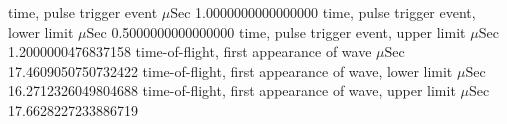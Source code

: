 \expandafter\def\csname oct2tex.water_d25_v800_P.t0.d\endcsname{time, pulse trigger event}
\expandafter\def\csname oct2tex.water_d25_v800_P.t0.u\endcsname{\ensuremath{\mu\text{Sec}}}
\expandafter\def\csname oct2tex.water_d25_v800_P.t0.v\endcsname{1.0000000000000000}
\expandafter\def\csname oct2tex.water_d25_v800_P.t0a.d\endcsname{time, pulse trigger event, lower limit}
\expandafter\def\csname oct2tex.water_d25_v800_P.t0a.u\endcsname{\ensuremath{\mu\text{Sec}}}
\expandafter\def\csname oct2tex.water_d25_v800_P.t0a.v\endcsname{0.5000000000000000}
\expandafter\def\csname oct2tex.water_d25_v800_P.t0b.d\endcsname{time, pulse trigger event, upper limit}
\expandafter\def\csname oct2tex.water_d25_v800_P.t0b.u\endcsname{\ensuremath{\mu\text{Sec}}}
\expandafter\def\csname oct2tex.water_d25_v800_P.t0b.v\endcsname{1.2000000476837158}
\expandafter\def\csname oct2tex.water_d25_v800_P.t1.d\endcsname{time-of-flight, first appearance of wave}
\expandafter\def\csname oct2tex.water_d25_v800_P.t1.u\endcsname{\ensuremath{\mu\text{Sec}}}
\expandafter\def\csname oct2tex.water_d25_v800_P.t1.v\endcsname{17.4609050750732422}
\expandafter\def\csname oct2tex.water_d25_v800_P.t1a.d\endcsname{time-of-flight, first appearance of wave, lower limit}
\expandafter\def\csname oct2tex.water_d25_v800_P.t1a.u\endcsname{\ensuremath{\mu\text{Sec}}}
\expandafter\def\csname oct2tex.water_d25_v800_P.t1a.v\endcsname{16.2712326049804688}
\expandafter\def\csname oct2tex.water_d25_v800_P.t1b.d\endcsname{time-of-flight, first appearance of wave, upper limit}
\expandafter\def\csname oct2tex.water_d25_v800_P.t1b.u\endcsname{\ensuremath{\mu\text{Sec}}}
\expandafter\def\csname oct2tex.water_d25_v800_P.t1b.v\endcsname{17.6628227233886719}
